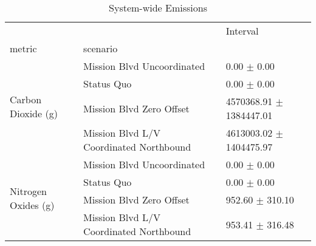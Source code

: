 \begin{table}
\caption{System-wide Emissions}
\begin{tabular}{lll}
\toprule
 &  & Interval \\
metric & scenario &  \\
\midrule
\multirow[t]{4}{*}{Carbon Dioxide (g)} & Mission Blvd Uncoordinated & 0.00 $\pm$ 0.00 \\
 & Status Quo & 0.00 $\pm$ 0.00 \\
 & Mission Blvd Zero Offset & 4570368.91 $\pm$ 1384447.01 \\
 & Mission Blvd L/V Coordinated Northbound & 4613003.02 $\pm$ 1404475.97 \\
\multirow[t]{4}{*}{Nitrogen Oxides (g)} & Mission Blvd Uncoordinated & 0.00 $\pm$ 0.00 \\
 & Status Quo & 0.00 $\pm$ 0.00 \\
 & Mission Blvd Zero Offset & 952.60 $\pm$ 310.10 \\
 & Mission Blvd L/V Coordinated Northbound & 953.41 $\pm$ 316.48 \\
\bottomrule
\end{tabular}
\end{table}
